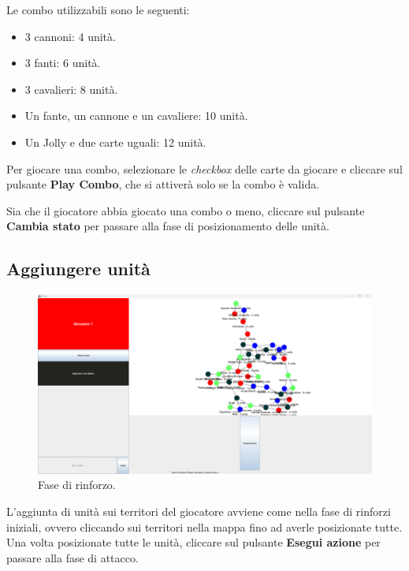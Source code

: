 \documentclass[a4paper,12pt]{report}
\begin{document}
Le combo utilizzabili sono le seguenti:
\begin{itemize}
	\item 3 cannoni: 4 unità.
	\item 3 fanti: 6 unità.
	\item 3 cavalieri: 8 unità.
	\item Un fante, un cannone e un cavaliere: 10 unità.
	\item Un Jolly e due carte uguali: 12 unità.
\end{itemize}
Per giocare una combo, selezionare le \textit{checkbox} delle carte da giocare e cliccare sul pulsante \textbf{Play Combo}, che si attiverà solo se la combo è valida.

Sia che il giocatore abbia giocato una combo o meno, cliccare sul pulsante \textbf{Cambia stato} per passare alla fase di posizionamento delle unità.
\subsection{Aggiungere unità}
\begin{figure}[H]
	\centering
	\includegraphics[width=1\textwidth]{user_guide/8_reinforcements.png}
	\caption{Fase di rinforzo.}
\end{figure}
L'aggiunta di unità sui territori del giocatore avviene come nella fase di rinforzi iniziali, ovvero cliccando sui territori nella mappa fino ad averle posizionate tutte.
Una volta posizionate tutte le unità, cliccare sul pulsante \textbf{Esegui azione} per passare alla fase di attacco.
\end{document}
